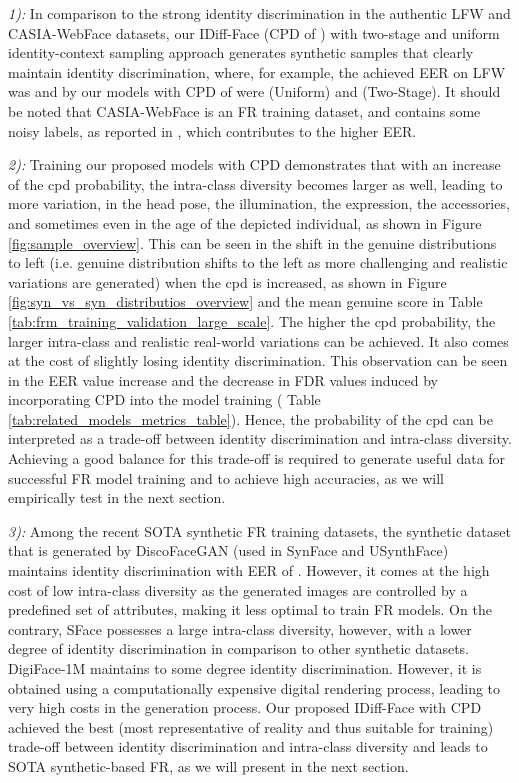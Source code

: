 \documentclass[10pt,twocolumn,letterpaper]{article}
\newcommand{\approachname}{IDiff-Face }
\begin{document}
\textit{1):} In comparison to the strong identity discrimination in the authentic LFW and CASIA-WebFace datasets, our \approachname (CPD of ) with two-stage and uniform identity-context sampling approach generates synthetic samples that clearly maintain identity discrimination, where, for example, the achieved EER on LFW was  and by our models with CPD of  were  (Uniform) and  (Two-Stage). It should be noted that CASIA-WebFace is an FR training dataset, and contains some noisy labels, as reported in \cite{DBLP:conf/iccv/WangWSWM19}, which contributes to the higher EER.  


\textit{2):} Training our proposed models with CPD demonstrates that with an increase of the \acrshort{cpd} probability, the intra-class diversity becomes larger as well, leading to more variation, in the head pose, the illumination, the expression, the accessories, and sometimes even in the age of the depicted individual, as shown in Figure \ref{fig:sample_overview}. This can be seen in the shift in the genuine distributions to left (i.e. genuine distribution shifts to the left as more challenging and realistic variations are generated) when the \acrshort{cpd} is increased, as shown in Figure \ref{fig:syn_vs_syn_distributios_overview} and the mean genuine score in Table \ref{tab:frm_training_validation_large_scale}. The higher the \acrshort{cpd} probability, the larger intra-class and realistic real-world variations can be achieved. It also comes at the cost of slightly losing identity discrimination. This observation can be seen in the EER value increase and the decrease in FDR values induced by incorporating CPD into the model training ( Table \ref{tab:related_models_metrics_table}). Hence, the probability of the \acrshort{cpd} can be interpreted as a trade-off between identity discrimination and intra-class diversity. Achieving a good balance for this trade-off is required to generate useful data for successful FR model training and to achieve high accuracies, as we will empirically test in the next section. 


\textit{3):} Among the recent SOTA synthetic FR training datasets, the synthetic dataset that is generated by DiscoFaceGAN \cite{Deng2020} (used in SynFace and USynthFace) maintains identity discrimination with EER of . However, it comes at the high cost of low intra-class diversity as the generated images are controlled by a predefined set of attributes, making it less optimal to train FR models. On the contrary, SFace possesses a large intra-class diversity, however, with a lower degree of identity discrimination in comparison to other synthetic datasets. DigiFace-1M maintains to some degree identity discrimination. However, it is obtained using a computationally expensive digital rendering process, leading to very high costs in the generation process. Our proposed \approachname with CPD achieved the best (most representative of reality and thus suitable for training) trade-off between identity discrimination and intra-class diversity and leads to SOTA synthetic-based FR, as we will present in the next section.
\end{document}
